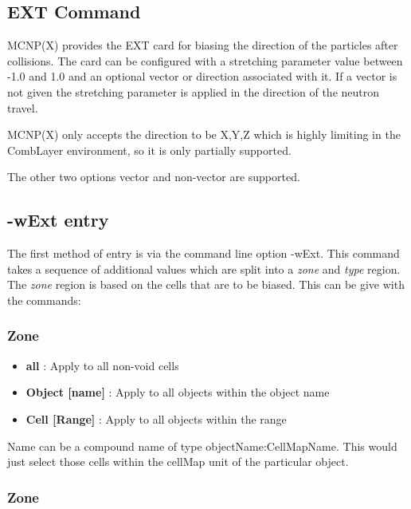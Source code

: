 
\subsection{EXT Command}
\label{ExtCommand}

MCNP(X) provides the EXT card for biasing the direction of the
particles after collisions. The card can be configured with a
stretching parameter value between -1.0 and 1.0 and an optional vector
or direction associated with it. If a vector is not given the
stretching parameter is applied in the direction of the neutron travel.

MCNP(X) only accepts the direction to be X,Y,Z which is highly
limiting in the CombLayer environment, so it is only partially supported.

The other two options vector and non-vector are supported.

\subsection{-wExt entry}

The first method of entry is via the command line option -wExt. This
command takes a sequence of additional values which are split into a
{\it zone} and {\it type} region. The {\it zone} region is based on
the cells that are to be biased. This can be give with the commands:

\subsubsection{Zone}

\begin{itemize}
\item{ {\bf all} : Apply to all non-void cells}
\item{ {\bf Object [name]} : Apply to all objects within the object name}
\item{ {\bf  Cell [Range]} : Apply to all objects within the range  }
\end{itemize}

Name can be a compound name of type objectName:CellMapName. This would
just select those cells within the cellMap unit of the particular
object.

\subsubsection{Zone}

